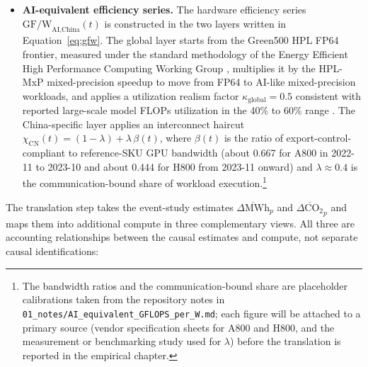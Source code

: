 \documentclass[12pt,a4paper]{article}
\begin{document}
\begin{itemize}
  \item \textbf{AI-equivalent efficiency series.} The hardware
        efficiency series $\text{GF/W}_{\text{AI,China}}(t)$ is
        constructed in the two layers written in
        Equation~\eqref{eq:gfw}. The global layer starts from the
        Green500 HPL FP64 frontier, measured under the standard
        methodology of the Energy Efficient High Performance Computing
        Working Group
        \citep{energyefficienthighperformancecomputingworkinggroup-2015-energyefficienthigh},
        multiplies it by the HPL-MxP mixed-precision speedup
        \citep{dongarraluszczek-2026-hplmxpbenchmarkmixedprecision}
        to move from FP64 to AI-like mixed-precision workloads, and
        applies a utilization realism factor
        $\kappa_{\text{global}} = 0.5$ consistent with reported
        large-scale model FLOPs utilization in the 40\% to 60\% range
        \citep{fernandezetal-2025-efficienthardwarescaling}. The
        China-specific layer applies an interconnect haircut
        $\chi_{\text{CN}}(t) = (1 - \lambda) + \lambda \, \beta(t)$,
        where $\beta(t)$ is the ratio of export-control-compliant to
        reference-SKU GPU bandwidth (about 0.667 for A800 in
        2022-11 to 2023-10 and about 0.444 for H800 from 2023-11
        onward) and $\lambda \approx 0.4$ is the communication-bound
        share of workload execution.\footnote{The bandwidth ratios
        and the communication-bound share are placeholder calibrations
        taken from the repository notes in
        \texttt{01\_notes/AI\_equivalent\_GFLOPS\_per\_W.md}; each
        figure will be attached to a primary source (vendor
        specification sheets for A800 and H800, and the measurement
        or benchmarking study used for $\lambda$) before the
        translation is reported in the empirical chapter.}

\end{itemize}

The translation step takes the event-study estimates
$\overline{\Delta\text{MWh}}_{p}$ and
$\overline{\Delta\text{CO}_{2}}_{p}$ and maps them into additional
compute in three complementary views. All three are accounting
relationships between the causal estimates and compute, not separate
causal identifications:
\end{document}
